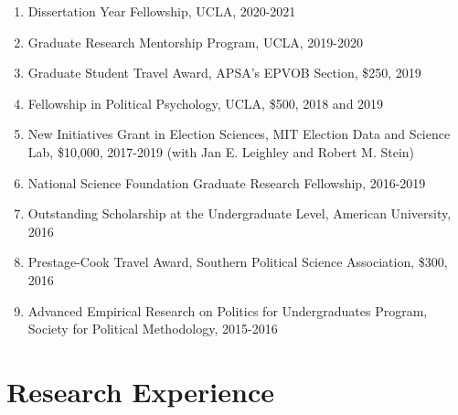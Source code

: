 \documentclass[12pt]{article}
\begin{document}
\begin{enumerate}[topsep = 0pt, itemsep = 1ex, partopsep  = 1ex, parsep = 1ex]

	\item[] Dissertation Year Fellowship, UCLA, 2020-2021
	
	\item[] Graduate Research Mentorship Program, UCLA, 2019-2020
	
	\item[] Graduate Student Travel Award, APSA's EPVOB Section, \$250, 2019
	
	\item[] Fellowship in Political Psychology, UCLA, \$500, 2018 and 2019
	
	\item[] New Initiatives Grant in Election Sciences, MIT Election Data and Science Lab, \$10,000, 2017-2019 (with Jan E. Leighley and Robert M. Stein)
	
	\item[] National Science Foundation Graduate Research Fellowship, 2016-2019
	
	\item[] Outstanding Scholarship at the Undergraduate Level, American University, 2016
	
	\item[] Prestage-Cook Travel Award, Southern Political Science Association, \$300, 2016
	
	\item[] Advanced Empirical Research on Politics for Undergraduates Program, Society for Political Methodology, 2015-2016
	
\end{enumerate}

\section*{Research Experience}
 
\end{document}
